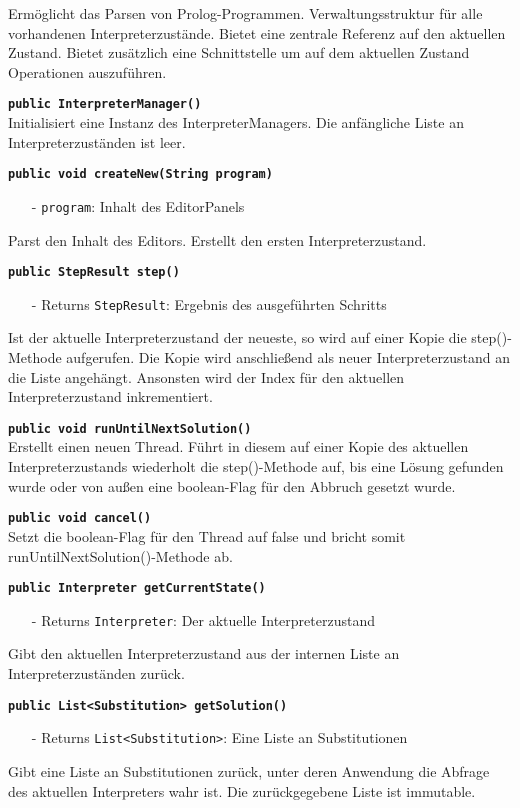 \documentclass[parskip=full,11pt,twoside]{scrartcl}
\begin{document}
Ermöglicht das Parsen von Prolog-Programmen. Verwaltungsstruktur für alle vorhandenen Interpreterzustände. Bietet eine zentrale Referenz auf den aktuellen Zustand. Bietet zusätzlich eine Schnittstelle um auf dem aktuellen Zustand Operationen auszuführen.

\textbf{\texttt{public InterpreterManager()}}\\
Initialisiert eine Instanz des InterpreterManagers. Die anfängliche Liste an Interpreterzuständen ist leer.

\textbf{\texttt{public void createNew(String program)}}
\begin{itemize}[noitemsep]
	\item[-] \texttt{program}: Inhalt des EditorPanels
\end{itemize}
Parst den Inhalt des Editors. Erstellt den ersten Interpreterzustand.

\textbf{\texttt{public StepResult step()}}
\begin{itemize}[noitemsep]
    \item[-] Returns \texttt{StepResult}: Ergebnis des ausgeführten Schritts
\end{itemize}
Ist der aktuelle Interpreterzustand der neueste, so wird auf einer Kopie die step()-Methode aufgerufen. Die Kopie wird anschließend als neuer Interpreterzustand an die Liste angehängt. Ansonsten wird der Index für den aktuellen Interpreterzustand inkrementiert.

\textbf{\texttt{public void runUntilNextSolution()}}\\
Erstellt einen neuen Thread. Führt in diesem auf einer Kopie des aktuellen Interpreterzustands wiederholt die step()-Methode auf, bis eine Lösung gefunden wurde oder von außen eine boolean-Flag für den Abbruch gesetzt wurde.

\textbf{\texttt{public void cancel()}}\\
Setzt die boolean-Flag für den Thread auf false und bricht somit runUntilNextSolution()-Methode ab. 

\textbf{\texttt{public Interpreter getCurrentState()}}
\begin{itemize}[noitemsep]
    \item[-] Returns \texttt{Interpreter}: Der aktuelle Interpreterzustand
\end{itemize}
Gibt den aktuellen Interpreterzustand aus der internen Liste an Interpreterzuständen zurück.

\textbf{\texttt{public List<Substitution> getSolution()}}
\begin{itemize}[noitemsep]
    \item[-] Returns \texttt{List<Substitution>}: Eine Liste an Substitutionen
\end{itemize}
Gibt eine Liste an Substitutionen zurück, unter deren Anwendung die Abfrage des aktuellen Interpreters wahr ist. Die zurückgegebene Liste ist immutable.
\end{document}
